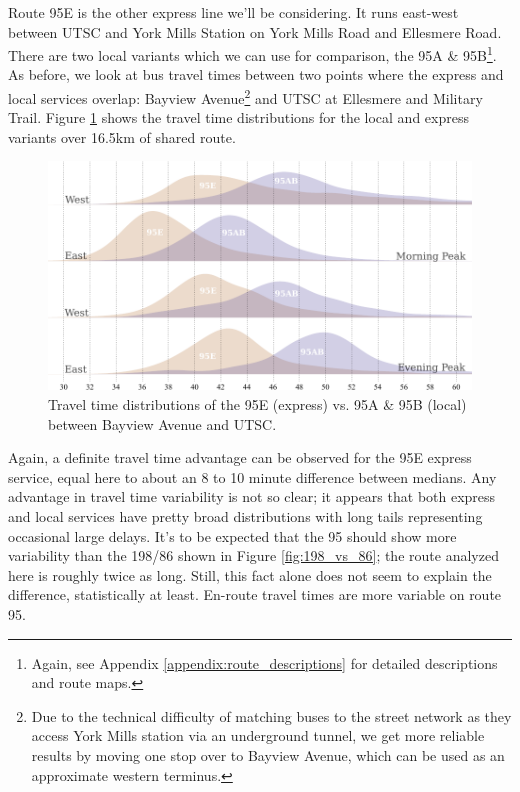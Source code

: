 \documentclass{article}
\begin{document}
		
		Route 95E is the other express line we'll be considering. It runs east-west between UTSC and York Mills Station on York Mills Road and Ellesmere Road. There are two local variants which we can use for comparison, the 95A \& 95B\footnote{
			Again, see Appendix \ref{appendix:route_descriptions} for detailed descriptions and route maps.
		}. 
		As before, we look at bus travel times between two points where the express and local services overlap: Bayview Avenue\footnote{
			Due to the technical difficulty of matching buses to the street network as they access York Mills station via an underground tunnel, we get more reliable results by moving one stop over to Bayview Avenue, which can be used as an approximate western terminus.
		} and UTSC at Ellesmere and Military Trail. Figure \ref{fig:95EvL} shows the travel time distributions for the local and express variants over 16.5km of shared route.

		\begin{figure}[h]
			\centering
			\includegraphics{figures/95_vs_95e_bayview_UTSC}
			\caption{Travel time distributions of the 95E (express) vs. 95A \& 95B (local) between Bayview Avenue and UTSC.}
			\label{fig:95EvL}
		\end{figure}
		
		Again, a definite travel time advantage can be observed for the 95E express service, equal here to about an 8 to 10 minute difference between medians. Any advantage in travel time variability is not so clear; it appears that both express and local services have pretty broad distributions with long tails representing occasional large delays. It's to be expected that the 95 should show more variability than the 198/86 shown in Figure \ref{fig:198_vs_86}; the route analyzed here is roughly twice as long. Still, this fact alone does not seem to explain the difference, statistically at least. En-route travel times are more variable on route 95.
		
\end{document}
